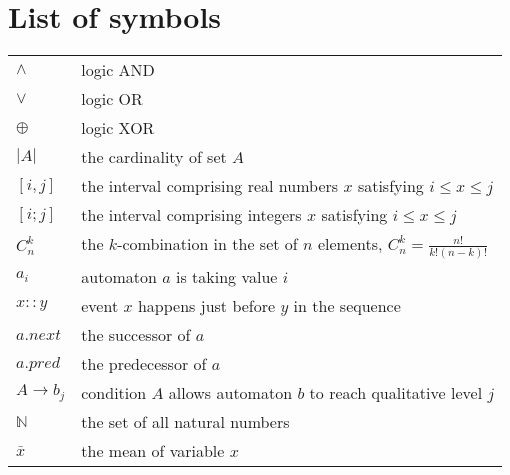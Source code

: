 \documentclass[11pt,twoside,openright]{report}
\theoremstyle{definition}
\begin{document}
\chapter*{List of symbols}
\thispagestyle{empty}
\begin{tabular}{l|l}
    $\land$ & logic AND\\
    $\lor$ & logic OR\\
    $\oplus$ & logic XOR\\
    $|A|$ & the cardinality of set $A$\\
    $[i,j]$& the interval comprising real numbers $x$ satisfying $i\leq x\leq j$\\
    $[i;j]$& the interval comprising integers $x$ satisfying $i\leq x\leq j$\\
    $C_n^k$& the $k$-combination in the set of $n$ elements, $C_n^k=\frac {n!}{k!(n-k)!}$\\
    $a_i$  & automaton $a$ is taking value $i$ \\
    $x::y$ & event $x$ happens just before $y$ in the sequence\\
    $a.next$&the successor of $a$\\
    $a.pred$ & the predecessor of $a$\\
    $A\to b_j$ & condition $A$ allows automaton $b$ to reach qualitative level $j$\\
    $\mathbb{N}$ & the set of all natural numbers\\
    $\bar{x}$ & the mean of variable $x$
\end{tabular}
\newpage
{} 















\appendix

\end{document}
